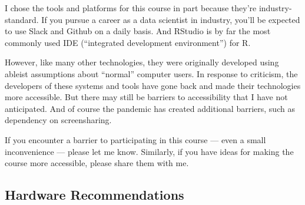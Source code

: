 \documentclass[
]{article}
\begin{document}
I chose the tools and platforms for this course in part because they're industry-standard. If you pursue a career as a data scientist in industry, you'll be expected to use Slack and Github on a daily basis. And RStudio is by far the most commonly used IDE (``integrated development environment'') for R.

However, like many other technologies, they were originally developed using ableist assumptions about ``normal'' computer users. In response to criticism, the developers of these systems and tools have gone back and made their technologies more accessible. But there may still be barriers to accessibility that I have not anticipated. And of course the pandemic has created additional barriers, such as dependency on screensharing.

If you encounter a barrier to participating in this course --- even a small inconvenience --- please let me know. Similarly, if you have ideas for making the course more accessible, please share them with me.

\hypertarget{hardware-recommendations}{%
\subsection{Hardware Recommendations}\label{hardware-recommendations}}
\end{document}
